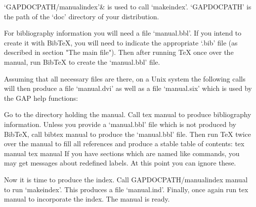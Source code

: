 `GAPDOCPATH/manualindex'&
    is used to call `makeindex'.
    `GAPDOCPATH' is the path of the `doc' directory of your {\GAP}
    distribution.
\enditems

For bibliography information you will need a file `manual.bbl'. If you
intend to create it with Bib{\TeX}, you will need to indicate the
appropriate `.bib' file (as described in section "The main file"). Then
after running {\TeX} once over the manual, run Bib{\TeX} to create the
`manual.bbl' file.

Assuming that all necessary files are there,
on a Unix system the following calls will then produce a file `manual.dvi'
as well as a file `manual.six' which is used by the GAP help functions:

Go to the directory holding the manual. Call
\begintt
tex manual
\endtt
to produce bibliography information. Unless you provide a `manual.bbl' file
which is not produced by Bib{\TeX}, call
\begintt
bibtex manual
\endtt
to produce the `manual.bbl' file. Then run {\TeX} twice over the manual to
fill all references and produce a stable table of contents:
\begintt
tex manual
tex manual
\endtt
If you have sections which are named like commands, you may get messages
about redefined labels. At this point you can ignore these.

Now it is time to produce the index. Call
\begintt
GAPDOCPATH/manualindex manual
\endtt
to run `makeindex'. This produces a file `manual.ind'. Finally, once again
run
\begintt
tex manual
\endtt
to incorporate the index. The manual is ready.


